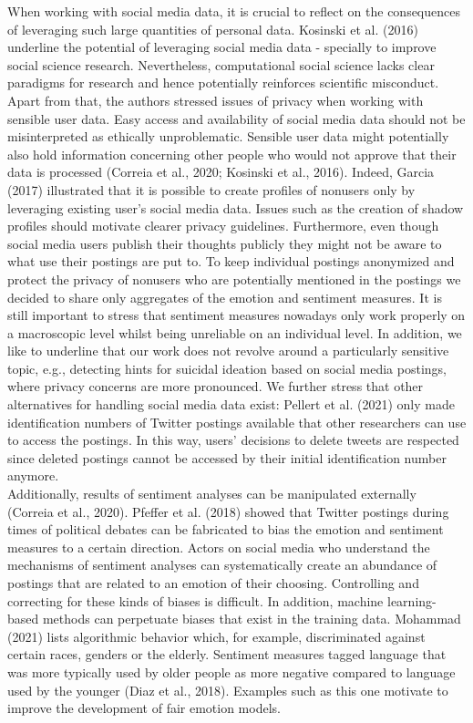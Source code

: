 \documentclass[
  english,
  jou,floatsintext]{apa7}
\begin{document}
When working with social media data, it is crucial to reflect on the consequences of leveraging such large quantities of personal data. Kosinski et al. (2016) underline the potential of leveraging social media data - specially to improve social science research. Nevertheless, computational social science lacks clear paradigms for research and hence potentially reinforces scientific misconduct. Apart from that, the authors stressed issues of privacy when working with sensible user data. Easy access and availability of social media data should not be misinterpreted as ethically unproblematic. Sensible user data might potentially also hold information concerning other people who would not approve that their data is processed (Correia et al., 2020; Kosinski et al., 2016). Indeed, Garcia (2017) illustrated that it is possible to create profiles of nonusers only by leveraging existing user's social media data. Issues such as the creation of shadow profiles should motivate clearer privacy guidelines. Furthermore, even though social media users publish their thoughts publicly they might not be aware to what use their postings are put to. To keep individual postings anonymized and protect the privacy of nonusers who are potentially mentioned in the postings we decided to share only aggregates of the emotion and sentiment measures. It is still important to stress that sentiment measures nowadays only work properly on a macroscopic level whilst being unreliable on an individual level. In addition, we like to underline that our work does not revolve around a particularly sensitive topic, e.g., detecting hints for suicidal ideation based on social media postings, where privacy concerns are more pronounced. We further stress that other alternatives for handling social media data exist: Pellert et al. (2021) only made identification numbers of Twitter postings available that other researchers can use to access the postings. In this way, users' decisions to delete tweets are respected since deleted postings cannot be accessed by their initial identification number anymore.\\
\hspace*{0.333em}\hspace*{0.333em} Additionally, results of sentiment analyses can be manipulated externally (Correia et al., 2020). Pfeffer et al. (2018) showed that Twitter postings during times of political debates can be fabricated to bias the emotion and sentiment measures to a certain direction. Actors on social media who understand the mechanisms of sentiment analyses can systematically create an abundance of postings that are related to an emotion of their choosing. Controlling and correcting for these kinds of biases is difficult.
In addition, machine learning-based methods can perpetuate biases that exist in the training data. Mohammad (2021) lists algorithmic behavior which, for example, discriminated against certain races, genders or the elderly. Sentiment measures tagged language that was more typically used by older people as more negative compared to language used by the younger (Diaz et al., 2018). Examples such as this one motivate to improve the development of fair emotion models.
\end{document}
